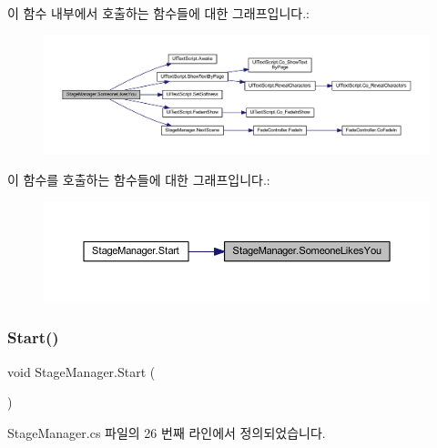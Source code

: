 이 함수 내부에서 호출하는 함수들에 대한 그래프입니다.\+:\nopagebreak
\begin{figure}[H]
\begin{center}
\leavevmode
\includegraphics[width=350pt]{da/de4/class_stage_manager_affba879c5906e1bbb53a18263449108c_cgraph}
\end{center}
\end{figure}
이 함수를 호출하는 함수들에 대한 그래프입니다.\+:\nopagebreak
\begin{figure}[H]
\begin{center}
\leavevmode
\includegraphics[width=350pt]{da/de4/class_stage_manager_affba879c5906e1bbb53a18263449108c_icgraph}
\end{center}
\end{figure}
\mbox{\label{class_stage_manager_ac5b1a1bb9910775d93dd65bb4119cb36}} 
\subsubsection{\texorpdfstring{Start()}{Start()}}
{\footnotesize\ttfamily void Stage\+Manager.\+Start (\begin{DoxyParamCaption}{ }\end{DoxyParamCaption})\hspace{0.3cm}{\ttfamily [private]}}



Stage\+Manager.\+cs 파일의 26 번째 라인에서 정의되었습니다.


